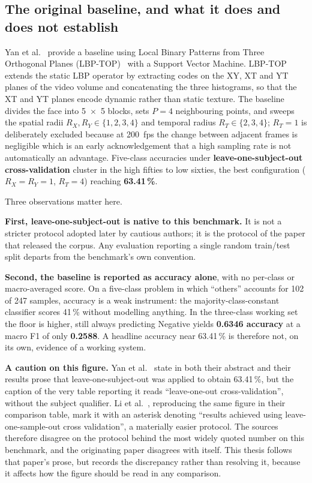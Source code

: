 \subsection{The original baseline, and what it does and does not establish}
\label{sec:original-baseline}

Yan et al.~\cite{yan2014} provide a baseline using Local Binary Patterns from Three Orthogonal Planes (LBP-TOP)~\cite{zhaoG2007} with a Support Vector Machine. LBP-TOP extends the static LBP operator by extracting codes on the XY, XT and YT planes of the video volume and concatenating the three histograms, so that the XT and YT planes encode dynamic rather than static texture. The baseline divides the face into 5~$\times$~5 blocks, sets $P = 4$ neighbouring points, and sweeps the spatial radii $R_X, R_Y \in \{1,2,3,4\}$ and temporal radius $R_T \in \{2,3,4\}$; $R_T = 1$ is deliberately excluded because at 200~fps the change between adjacent frames is negligible which is an early acknowledgement that a high sampling rate is not automatically an advantage. Five-class accuracies under \textbf{leave-one-subject-out cross-validation} cluster in the high fifties to low sixties, the best configuration ($R_X = R_Y = 1$, $R_T = 4$) reaching \textbf{63.41\,\%}.

Three observations matter here.

\textbf{First, leave-one-subject-out is native to this benchmark.} It is not a stricter protocol adopted later by cautious authors; it is the protocol of the paper that released the corpus. Any evaluation reporting a single random train/test split departs from the benchmark's own convention.

\textbf{Second, the baseline is reported as accuracy alone}, with no per-class or macro-averaged score. On a five-class problem in which ``others'' accounts for 102 of 247 samples, accuracy is a weak instrument: the majority-class-constant classifier scores 41\,\% without modelling anything. In the three-class working set the floor is higher, still always predicting Negative yields \textbf{0.6346 accuracy} at a macro F1 of only \textbf{0.2588}. A headline accuracy near 63.41\,\% is therefore not, on its own, evidence of a working system.

\textbf{A caution on this figure.} Yan et al.~\cite{yan2014} state in both their abstract and their results prose that leave-one-subject-out was applied to obtain 63.41\,\%, but the caption of the very table reporting it reads ``leave-one-out cross-validation'', without the subject qualifier. Li et al.~\cite{liX2018}, reproducing the same figure in their comparison table, mark it with an asterisk denoting ``results achieved using leave-one-sample-out cross validation'', a materially easier protocol. The sources therefore disagree on the protocol behind the most widely quoted number on this benchmark, and the originating paper disagrees with itself. This thesis follows that paper's prose, but records the discrepancy rather than resolving it, because it affects how the figure should be read in any comparison.

